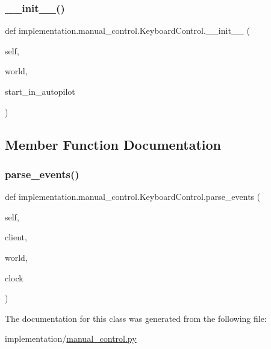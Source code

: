 \subsubsection{\texorpdfstring{\+\_\+\+\_\+init\+\_\+\+\_\+()}{\_\_init\_\_()}}
{\footnotesize\ttfamily def implementation.\+manual\+\_\+control.\+Keyboard\+Control.\+\_\+\+\_\+init\+\_\+\+\_\+ (\begin{DoxyParamCaption}\item[{}]{self,  }\item[{}]{world,  }\item[{}]{start\+\_\+in\+\_\+autopilot }\end{DoxyParamCaption})}



\subsection{Member Function Documentation}
\mbox{\label{classimplementation_1_1manual__control_1_1_keyboard_control_a1217f115f0929922b01ba00a4aebf42c}} 
\subsubsection{\texorpdfstring{parse\+\_\+events()}{parse\_events()}}
{\footnotesize\ttfamily def implementation.\+manual\+\_\+control.\+Keyboard\+Control.\+parse\+\_\+events (\begin{DoxyParamCaption}\item[{}]{self,  }\item[{}]{client,  }\item[{}]{world,  }\item[{}]{clock }\end{DoxyParamCaption})}



The documentation for this class was generated from the following file\+:\begin{DoxyCompactItemize}
\item 
implementation/\hyperlink{manual__control_8py}{manual\+\_\+control.\+py}\end{DoxyCompactItemize}
